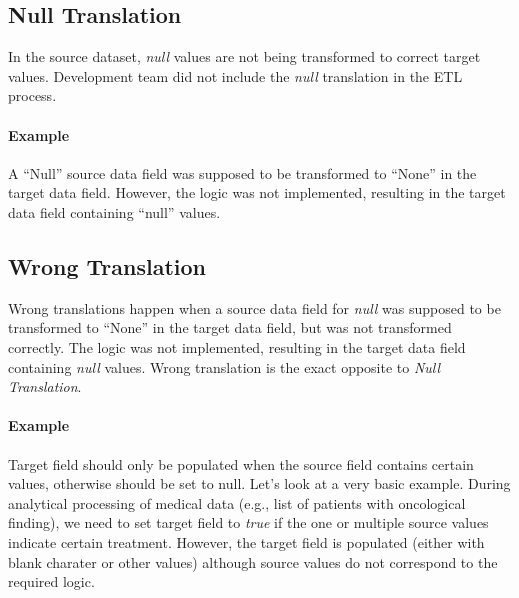\subsection*{Null Translation}

In the source dataset, \textit{null} values are not being transformed to correct target values.
Development team did not include the \textit{null} translation in the ETL process.

\paragraph*{Example} A \enquote{Null} source data field was supposed to be transformed to \enquote{None} in the target data field.
However, the logic was not implemented, resulting in the target data field containing \enquote{null} values\footnotemark.



\subsection*{Wrong Translation}

Wrong translations happen when a source data field for \textit{null} was supposed to be transformed to \enquote{None} in the target data field, but was not transformed correctly.
The logic was not implemented, resulting in the target data field containing \textit{null} values.
Wrong translation is the exact opposite to \textit{Null Translation}.

\paragraph*{Example} Target field should only be populated when the source field contains certain values, otherwise should be set to null.
Let's look at a very basic example.
During analytical processing of medical data (e.g., list of patients with oncological finding), we need to set target field to \textit{true} if the one or multiple source values indicate certain treatment.
However, the target field is populated (either with blank charater or other values) although source values do not correspond to the required logic.

